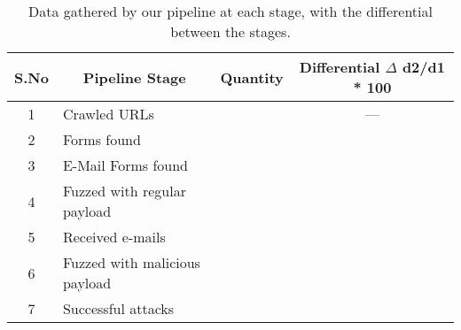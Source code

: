 \begin{table}[!htbp]
	\centering
	\begin{tabular}{|c|l|c|c|}
		\hline
		\multicolumn{1}{|c|}{\textbf{S.No}} &
		\multicolumn{1}{c|}{\textbf{Pipeline Stage}} &
		\multicolumn{1}{p{3cm}|}{\centering \textbf{Quantity}} &
		\multicolumn{1}{p{2.8cm}|}{\centering \textbf{Differential}
		$\Delta$ d2/d1 * 100}\\
		\hline
		1 &  Crawled URLs  & \urls &  --- \\
		\hline
		2 &  Forms found  & \forms & \formsDelta \\
		\hline
		3 &  E-Mail Forms found  & \emailforms & \emailformsDelta \\
		\hline
		4 &  Fuzzed with regular payload  & \fuzzed & \fuzzedDelta \\
		\hline
		5 &  Received e-mails  & \recd & \recdDelta \\
		\hline
		6 &  Fuzzed with malicious payload  & \malfuzzed & \malfuzzedDelta \\
		\hline
		7 &  Successful attacks  & \success & \successDelta \\
		\hline

	\end{tabular}
	\caption[]{Data gathered by our pipeline at each stage, with the differential between the stages.}
	\label{tab:pipeline}
\end{table}